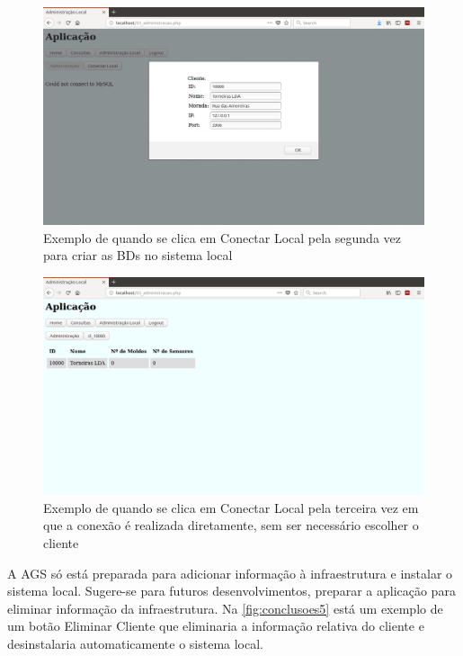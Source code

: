 \documentclass[11pt,twoside,a4paper]{report}
\begin{document}
\begin{figure}[H]
	\begin{center}
		\includegraphics[trim={0 7cm 0 0},clip,width=1\textwidth]{futuro04} %
		\caption[Exemplo de quando se clica em Conectar Local pela segunda vez]{Exemplo de quando se clica em Conectar Local pela segunda vez para criar as BDs no sistema local}
		\label{fig:conclusoes11}
	\end{center}
\end{figure}
\begin{figure}[H]
	\begin{center}
		\includegraphics[trim={0 14cm 0 0},clip,width=1\textwidth]{administracao02} %
		\caption[Exemplo de quando se clica em Conectar Local pela terceira vez]{Exemplo de quando se clica em Conectar Local pela terceira vez em que a conexão é realizada diretamente, sem ser necessário escolher o cliente}
		\label{fig:conclusoes12}
	\end{center}
\end{figure}
A AGS só está preparada para adicionar informação à infraestrutura e instalar o sistema local. Sugere-se para futuros desenvolvimentos, preparar a aplicação para eliminar informação da infraestrutura. Na \autoref{fig:conclusoes5} está um exemplo de um botão Eliminar Cliente que eliminaria a informação relativa do cliente e desinstalaria automaticamente o sistema local.
\end{document}
